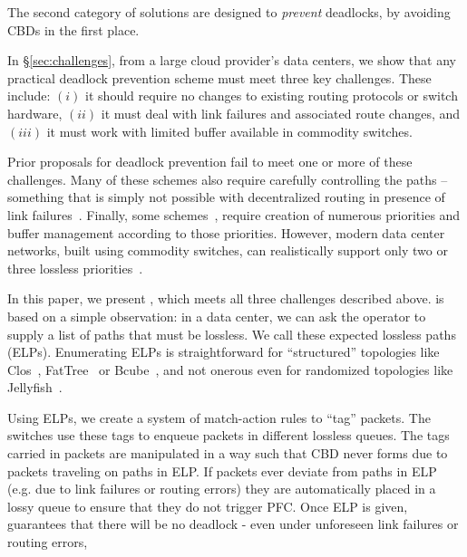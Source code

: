 The second category of solutions are designed to {\em prevent} deadlocks, by avoiding CBDs in the first place.

In \S\ref{sec:challenges},  from a large cloud provider's data
centers, we show that any practical deadlock prevention scheme must meet three
key challenges. These include: $(i)$ it should require no changes to existing
routing protocols or switch hardware, $(ii)$ it must deal with link failures and
associated  route changes, and $(iii)$ it must work with limited buffer
available in commodity switches.

Prior proposals for deadlock prevention fail to meet one or more of these
challenges. 
Many of these schemes also
require carefully controlling the paths -- something that is simply not possible
with decentralized routing in presence of link failures~\cite{netpilot}.
Finally, some schemes~\cite{firstpaper,survey,datanetworks,karol2003prevention},
require creation of numerous priorities and buffer management according to those
priorities.  However, modern data center networks, built using commodity
switches, can realistically support only two or three lossless
priorities~\cite{rdmaatscale}.

In this paper, we present \sysname{}, which meets all three challenges described
above. \sysname{} is based on a simple observation: in a data center, we can ask
the operator to supply a list of paths that must be lossless.  We call these
expected lossless paths (ELPs). Enumerating ELPs is straightforward for
``structured'' topologies like Clos~\cite{clos}, FatTree~\cite{fattree} or
Bcube~\cite{bcube}, and not onerous even for randomized topologies like
Jellyfish~\cite{jellyfish}.

Using ELPs, we create a system of match-action rules to ``tag'' packets. The
switches use these tags to enqueue packets in different lossless queues. The
tags carried in packets are manipulated in a way such that CBD never forms due
to packets traveling on paths in ELP.  If packets ever deviate from paths in ELP
(e.g. due to link failures or routing errors) they are automatically placed in a
lossy queue to ensure that they do not trigger PFC.  Once ELP is given, \sysname{} guarantees that
there will be no deadlock - even under unforeseen link failures or routing
errors,  

